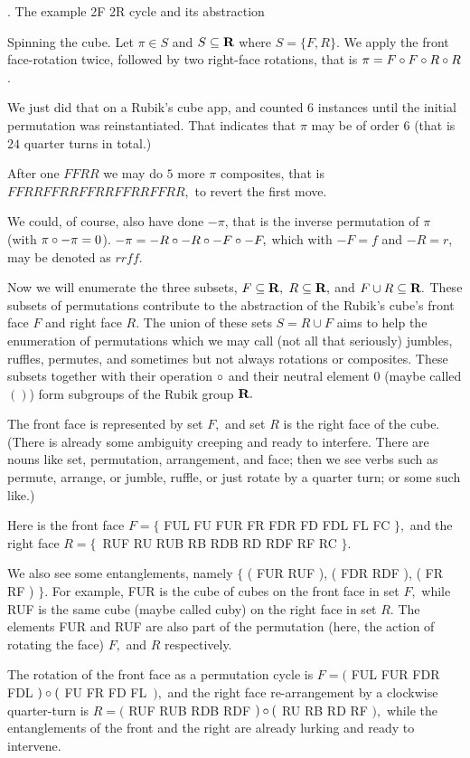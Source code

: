 \eject
{}. The example 2F 2R cycle and its abstraction

\def\R{\hbox{\bf R}}%
\e Spinning the cube.  Let $\pi\in S$ and $S\subseteq \R$
where $S=\{ F, R \}$. We apply the front face-rotation twice,
followed by two right-face rotations, that is
$\pi=F\circ F\circ R\circ R$.

We just did that on a Rubik's cube app, and counted
6 instances until the initial permutation was reinstantiated.
That indicates that $\pi$ may be of order $6$
(that is $24$ quarter turns in total.)

After one $FFRR$ we may do $5$ more $\pi$ composites, that is
$FFRR FFRR FFRR FFRR FFRR,$ to revert the first move.

We could, of course, also have done $-\pi$, that is the inverse
permutation of $\pi$ (with $\pi\circ-\pi=0$). $-\pi=-R\circ-R\circ-F\circ-F,$
which with $-F=f$ and $-R=r$, may be denoted as $rrff.$

\e Now we will enumerate the three subsets,
$F\subseteq \R,$ $R\subseteq \R,$ and $F\cup R\subseteq \R.$
These subsets of permutations contribute to the abstraction of
the Rubik's cube's front face $F$ and right face $R.$  The
union of these sets $S=R\cup F$ aims to help the enumeration
of permutations which we may call (not all that seriously)
jumbles, ruffles, permutes, and sometimes but not always
rotations or composites.  These subsets together with their
operation $\circ$ and their neutral element $0$ (maybe called $()$)
form subgroups of the Rubik group $\R.$

\e The front face is represented by set $F,$ and set $R$
is the right face of the cube. (There is already some
ambiguity creeping and ready to interfere.
There are nouns like set, permutation, arrangement, and face;
then we see verbs such as permute, arrange, or jumble,
ruffle, or just rotate by a quarter turn; or some such
like.)

\eject
Here is the front face
$F=\{$ FUL FU FUR FR FDR FD FDL FL FC $\},$
and the right face
$R=\{$~RUF RU RUB RB RDB RD RDF RF RC $\}.$

We also see some entanglements, namely
$\{$ ( FUR RUF ), ( FDR RDF ), ( FR RF ) $\}.$
For example, FUR is the cube of cubes on the
front face in set $F,$
while RUF is the same cube (maybe called cuby)
on the right face in set $R.$
The elements FUR and RUF are also part of the
permutation (here, the action of rotating the face)
$F,$ and $R$ respectively.

\e The rotation of the front face as a permutation cycle is
$F=($ FUL FUR FDR FDL $)\circ($ FU FR FD FL~$),$
and the right face re-arrangement by a clockwise quarter-turn
is $R=($ RUF RUB RDB RDF $)\circ($ RU RB RD RF $),$
while the entanglements of the front and the right are
already lurking and ready to intervene.

